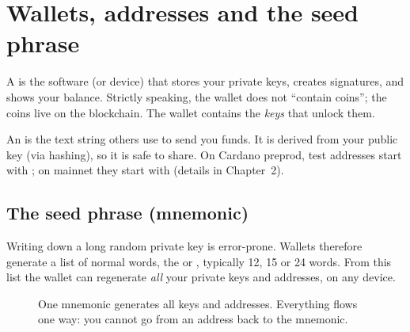 \section{Wallets, addresses and the seed phrase}

A  is the software (or device) that stores your private keys, creates signatures, and shows your balance. Strictly speaking, the wallet does not ``contain coins''; the coins live on the blockchain. The wallet contains the \emph{keys} that unlock them.

An  is the text string others use to send you funds. It is derived from your public key (via hashing), so it is safe to share. On Cardano preprod, test addresses start with ; on mainnet they start with  (details in Chapter~2).

\subsection{The seed phrase (mnemonic)}
Writing down a long random private key is error-prone. Wallets therefore generate a list of normal words, the  or , typically 12, 15 or 24 words. From this list the wallet can regenerate \emph{all} your private keys and addresses, on any device.

\begin{figure}[h]
\centering
{}
\caption{One mnemonic generates all keys and addresses. Everything flows one way: you cannot go from an address back to the mnemonic.}
\end{figure}

